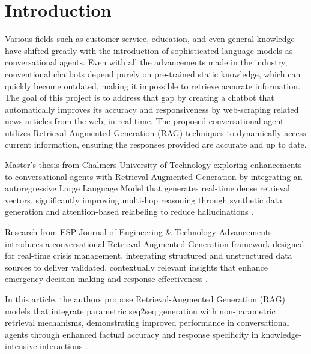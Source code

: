 \documentclass[fleqn,moreauthors,10pt]{ds_report}
\affiliation{\textit{Advisors: Slavko Žitnik}}
\begin{document}
\flushbottom 

\maketitle 

\thispagestyle{empty} 


\section*{Introduction}
    Various fields such as customer service, education, and even general knowledge have shifted greatly with the introduction of sophisticated language models as conversational agents. Even with all the advancements made in the industry, conventional chatbots depend purely on pre-trained static knowledge, which can quickly become outdated, making it impossible to retrieve accurate information. The goal of this project is to address that gap by creating a chatbot that automatically improves its accuracy and responsiveness by web-scraping related news articles from the web, in real-time.
    The proposed conversational agent utilizes Retrieval-Augmented Generation (RAG) techniques to dynamically access current information, ensuring the responses provided are accurate and up to date.

    Master's thesis from Chalmers University of Technology exploring enhancements to conversational agents with Retrieval-Augmented Generation by integrating an autoregressive Large Language Model that generates real-time dense retrieval vectors, significantly improving multi-hop reasoning through synthetic data generation and attention-based relabeling to reduce hallucinations \cite{RAG1}.

    Research from ESP Journal of Engineering \& Technology Advancements introduces a conversational Retrieval-Augmented Generation framework designed for real-time crisis management, integrating structured and unstructured data sources to deliver validated, contextually relevant insights that enhance emergency decision-making and response effectiveness \cite{jeta2024}.

    In this article, the authors propose Retrieval-Augmented Generation (RAG) models that integrate parametric seq2seq generation with non-parametric retrieval mechanisms, demonstrating improved performance in conversational agents through enhanced factual accuracy and response specificity in knowledge-intensive interactions \cite{NEURIPS2020_6b493230}.
\end{document}
